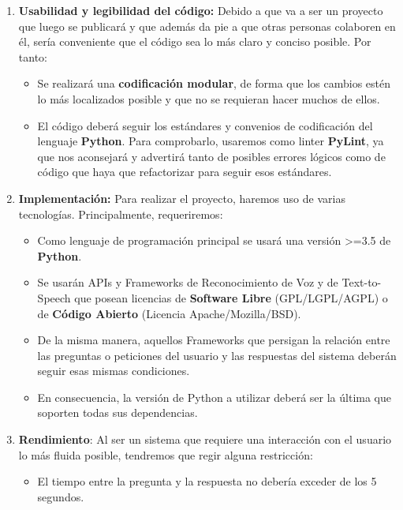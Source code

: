 \begin{enumerate}
	\item \textbf{Usabilidad y legibilidad del código:} Debido a que va a ser un proyecto que luego se publicará y que además da pie a que otras personas colaboren en él, sería conveniente que el código sea lo más claro y conciso posible. Por tanto:
	\begin{itemize}
		\item Se realizará una \textbf{codificación modular}, de forma que los cambios estén lo más localizados posible y que no se requieran hacer muchos de ellos.
		\item El código deberá seguir los estándares y convenios de codificación del lenguaje \textbf{Python}. Para comprobarlo, usaremos como linter \textbf{PyLint}, ya que nos aconsejará y advertirá tanto de posibles errores lógicos como de código que haya que refactorizar para seguir esos estándares.
	\end{itemize}

	\item \textbf{Implementación:} Para realizar el proyecto, haremos uso de varias tecnologías. Principalmente, requeriremos:
		\begin{itemize}
			\item Como lenguaje de programación principal se usará una versión >=3.5 de \textbf{Python}.
			\item Se usarán APIs y Frameworks de Reconocimiento de Voz y de Text-to-Speech que posean licencias de \textbf{Software Libre} (GPL/LGPL/AGPL) o de \textbf{Código Abierto} (Licencia Apache/Mozilla/BSD).
			\item De la misma manera, aquellos Frameworks que persigan la relación entre las preguntas o peticiones del usuario y las respuestas del sistema deberán seguir esas mismas condiciones.
			\item En consecuencia, la versión de Python a utilizar deberá ser la última que soporten todas sus dependencias.
		\end{itemize}
	
	\item \textbf{Rendimiento}: Al ser un sistema que requiere una interacción con el usuario lo más fluida posible, tendremos que regir alguna restricción:
	\begin{itemize}
		\item El tiempo entre la pregunta y la respuesta no debería exceder de los 5 segundos.
	\end{itemize}


\end{enumerate}
